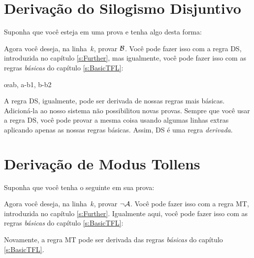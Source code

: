 \section{Deriva\c c\~ao do Silogismo Disjuntivo}
Suponha que voc\^e esteja em uma prova e tenha algo desta forma:
\begin{fitchproof}
\end{fitchproof}
Agora voc\^e deseja, na linha~$k$, provar $\mathcal{B}$. Voc\^e pode fazer isso com a regra DS, introduzida no cap\'itulo \ref{s:Further}, mas igualmente, voc\^e pode fazer isso com as regras  \emph{b\'asicas} do cap\'itulo \ref{s:BasicTFL}:
 

	\begin{fitchproof}
		\open
		\close
		\open
		\close
	\oe{ab, a-b1, b-b2}
\end{fitchproof}
A regra DS, igualmente, pode ser derivada de nossas regras mais b\'asicas. Adicion\'a-la ao nosso sistema n\~ao possibilitou novas provas. Sempre  que voc\^e usar a regra DS, voc\^e pode provar a mesma coisa usando algumas linhas extras aplicando apenas as nossas regras b\'asicas. Assim, DS \'e uma regra \emph{derivada}.

\section{Deriva\c c\~ao de Modus Tollens}
Suponha que voc\^e tenha o seguinte em sua prova:
\begin{fitchproof}
\end{fitchproof}
Agora voc\^e deseja, na linha~$k$, provar $\neg \mathcal{A}$. Voc\^e pode fazer isso com a regra  MT, introduzida no cap\'itulo \ref{s:Further}.  Igualmente aqui, voc\^e pode fazer isso com as regras  \emph{b\'asicas} do cap\'itulo \ref{s:BasicTFL}:
 
\begin{fitchproof}
		\open
		\close
\end{fitchproof}
Novamente, a regra  MT pode ser derivada das regras  \emph{b\'asicas} do cap\'itulo \ref{s:BasicTFL}.

